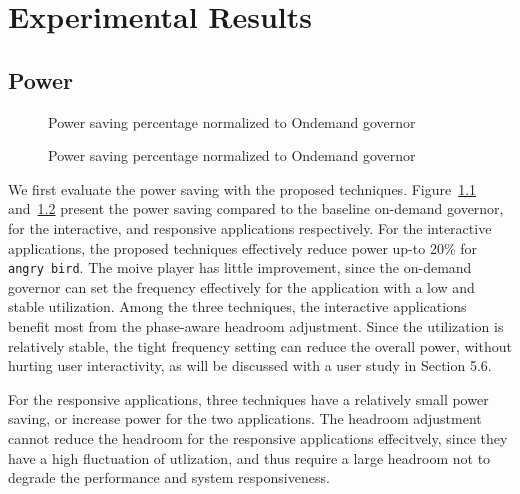 \chapter{Experimental Results}



\section{Power}

\begin{figure}[bt]
\begin{center}
\end{center}
\caption{Power saving percentage normalized to Ondemand governor}
\label{fig:interactive_power_result}
\end{figure}

\begin{figure}[bt]
\begin{center}
\end{center}
\caption{Power saving percentage normalized to Ondemand governor}
\label{fig:responsive_power}
\end{figure}

We first evaluate the power saving with the proposed techniques. Figure~\ref{fig:interactive_power_result} and~\ref{fig:responsive_power} 
present the power saving compared to the baseline on-demand governor, for the interactive, and responsive applications respectively. 
For the interactive applications, the proposed techniques effectively reduce power up-to 20\% for {\tt angry bird}. 
The moive player has little improvement, since the on-demand governor can set the frequency effectively for the application with
a low and stable utilization. Among the three techniques, the interactive applications benefit most from the phase-aware headroom
adjustment. Since the utilization is relatively stable, the tight frequency setting can reduce the overall power, without
hurting user interactivity, as will be discussed with a user study in Section 5.6. 

For the responsive applications, three techniques have a relatively small power saving, or increase power for the two applications.
The headroom adjustment cannot reduce the headroom for the responsive applications effecitvely, since they have a high fluctuation of 
utlization, and thus require a large headroom not to degrade the performance and system responsiveness. 

